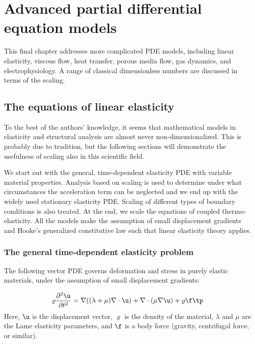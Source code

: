 \documentclass[graybox,envcountchap,sectrefs,final]{svmonodo}
\begin{document}
\chapter{Advanced partial differential equation models}

This final chapter addresses more complicated PDE models, including
linear elasticity, viscous flow, heat transfer, porous media flow,
gas dynamics, and electrophysiology. A range of
classical dimensionless numbers are discussed in terms of the scaling.

\section{The equations of linear elasticity}
\label{scale:elasticity}

To the best of the authors' knowledge, it seems that mathematical
models in elasticity and structural analysis are almost never
non-dimensionalized. This is probably due to tradition, but the
following sections will demonstrate the usefulness of scaling also in
this scientific field.

We start out with the general, time-dependent elasticity PDE with
variable material properties. Analysis based on scaling is used to
determine under what circumstances the acceleration term can be neglected
and we end up with the widely used stationary
elasticity PDE. Scaling of different types of boundary conditions is
also treated.  At the end, we scale the equations of coupled
thermo-elasticity. All the models make the assumption of small
displacement gradients and Hooke's generalized constitutive law
such that linear elasticity theory applies.

\subsection{The general time-dependent elasticity problem}
\label{scale:elasticity:timedep}

The following vector PDE governs deformation and stress in purely elastic
materials, under the assumption of small displacement gradients:

\begin{equation}
\varrho\frac{\partial^2\u}{\partial t^2} =
\nabla ((\lambda + \mu)\nabla\cdot\u) + \nabla\cdot(\mu\nabla\u) +
\varrho\f\tp
\label{scale:elasticity:PDE1}
\end{equation}
Here, $\u$ is the displacement vector,
$\varrho$ is the density of the material, $\lambda$ and $\mu$ are
the Lame elasticity parameters, and $\f$ is a body force (gravity,
centrifugal force, or similar).
\end{document}
